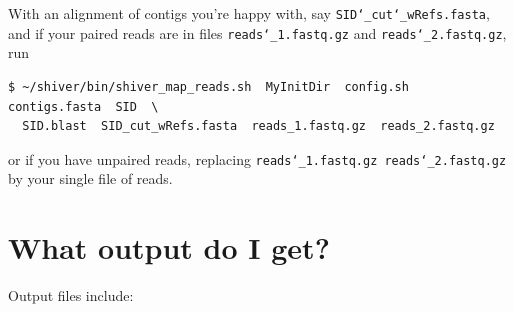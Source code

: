 \documentclass{article}
\let\c\texttt
\begin{document}
With an alignment of contigs you're happy with, say \c{SID\char`_cut\char`_wRefs.fasta}, and if your paired reads are in files \c{reads\char`_1.fastq.gz} and \c{reads\char`_2.fastq.gz}, run
\begin{Verbatim}[samepage=true]
$ ~/shiver/bin/shiver_map_reads.sh  MyInitDir  config.sh  contigs.fasta  SID  \
  SID.blast  SID_cut_wRefs.fasta  reads_1.fastq.gz  reads_2.fastq.gz
\end{Verbatim}
or if you have unpaired reads, replacing \c{reads\char`_1.fastq.gz reads\char`_2.fastq.gz} by your single file of reads.

\section{What output do I get?}

Output files include:
\end{document}
